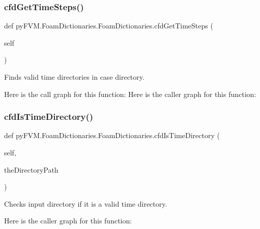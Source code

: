 \subsubsection{\texorpdfstring{cfdGetTimeSteps()}{cfdGetTimeSteps()}}
{\footnotesize\ttfamily def py\+F\+V\+M.\+Foam\+Dictionaries.\+Foam\+Dictionaries.\+cfd\+Get\+Time\+Steps (\begin{DoxyParamCaption}\item[{}]{self }\end{DoxyParamCaption})}

\begin{DoxyVerb}Finds valid time directories in case directory.
\end{DoxyVerb}
 Here is the call graph for this function\+:
Here is the caller graph for this function\+:
\mbox{\label{classpy_f_v_m_1_1_foam_dictionaries_1_1_foam_dictionaries_a6eda998c08965775c1a5c7e4b9d2dd43}} 
\subsubsection{\texorpdfstring{cfdIsTimeDirectory()}{cfdIsTimeDirectory()}}
{\footnotesize\ttfamily def py\+F\+V\+M.\+Foam\+Dictionaries.\+Foam\+Dictionaries.\+cfd\+Is\+Time\+Directory (\begin{DoxyParamCaption}\item[{}]{self,  }\item[{}]{the\+Directory\+Path }\end{DoxyParamCaption})}

\begin{DoxyVerb}Checks input directory if it is a valid time directory.    
\end{DoxyVerb}
 Here is the caller graph for this function\+:
\mbox{\label{classpy_f_v_m_1_1_foam_dictionaries_1_1_foam_dictionaries_a5aa388360d6ae0e2f1fbbb5c40fafc84}} 
